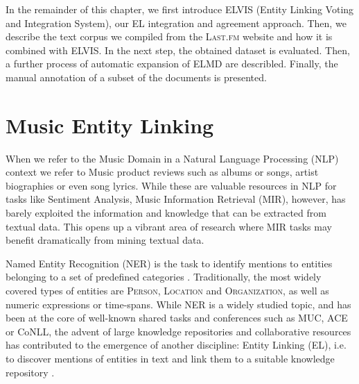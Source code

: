 In the remainder of this chapter, we first introduce \textsc{ELVIS} (Entity Linking Voting and Integration System), our EL integration and agreement approach. Then, we describe the text corpus we compiled from the \textsc{Last.fm} website and how it is combined with ELVIS. In the next step, the obtained dataset is evaluated. Then, a further process of automatic expansion of \textsc{ELMD} are describled. Finally, the manual annotation of a subset of the documents is presented. %


\section{Music Entity Linking}

When we refer to the Music Domain in a Natural Language Processing (NLP) context we refer to Music product reviews such as albums or songs, artist biographies or even song lyrics. While these are valuable resources in NLP for tasks like Sentiment Analysis, Music Information Retrieval (MIR), however, has barely exploited the information and knowledge that can be extracted from textual data. This opens up a vibrant area of research where MIR tasks may benefit dramatically from mining textual data. 

Named Entity Recognition (NER) is the task to identify mentions to entities belonging to a set of predefined categories \cite{ZhouandJian2002}. Traditionally, the most widely covered types of entities are \textsc{Person}, \textsc{Location} and \textsc{Organization}, as well as numeric expressions or time-spans. While NER is a widely studied topic, and has been at the core of well-known shared tasks and conferences \cite{Nadeau2007} such as MUC, ACE or CoNLL, the advent of large knowledge repositories and collaborative resources has contributed to the emergence of another discipline: Entity Linking (EL), i.e. to discover mentions of entities in text and link them to a suitable knowledge repository \cite{Moroetal2014}.


